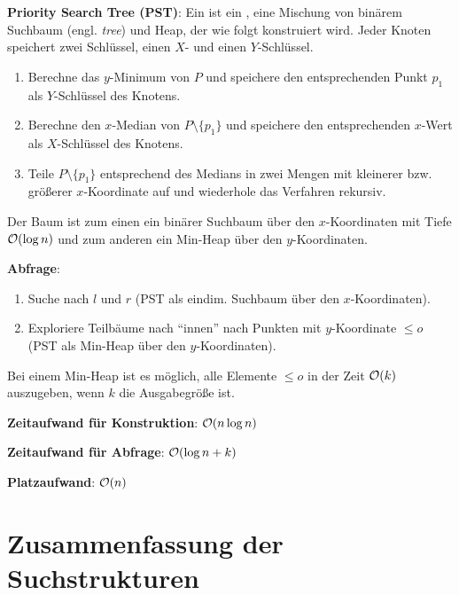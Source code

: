 \textbf{Priority Search Tree (PST)}:
Ein  ist ein , eine Mischung von
binärem Suchbaum (engl. \emph{tree}) und Heap, der wie folgt konstruiert wird.
Jeder Knoten speichert zwei Schlüssel, einen $X$- und einen $Y$-Schlüssel.
\begin{enumerate}
    \item
    Berechne das $y$-Minimum von $P$ und
    speichere den entsprechenden Punkt $p_1$ als $Y$-Schlüssel des Knotens.

    \item
    Berechne den $x$-Median von $P \setminus \{p_1\}$ und
    speichere den entsprechenden $x$-Wert als $X$-Schlüssel des Knotens.

    \item
    Teile $P \setminus \{p_1\}$ entsprechend des Medians in zwei Mengen mit kleinerer bzw.
    größerer $x$-Koordinate auf und wiederhole das Verfahren rekursiv.
\end{enumerate}

Der Baum ist zum einen ein binärer Suchbaum über den $x$-Koordinaten mit Tiefe $\mathcal{O}(\log n)$
und zum anderen ein Min-Heap über den $y$-Koordinaten.

\linie

\textbf{Abfrage}:
\begin{enumerate}
    \item
    Suche nach $l$ und $r$ (PST als eindim. Suchbaum über den $x$-Koordinaten).

    \item
    Exploriere Teilbäume nach "`innen"' nach Punkten mit $y$-Koordinate $\le o$\\
    (PST als Min-Heap über den $y$-Koordinaten).
\end{enumerate}

Bei einem Min-Heap ist es möglich, alle Elemente $\le o$ in der Zeit $\mathcal{O}(k)$ auszugeben,
wenn $k$ die Ausgabegröße ist.

\linie

\textbf{Zeitaufwand für Konstruktion}:
$\mathcal{O}(n \log n)$

\textbf{Zeitaufwand für Abfrage}:
$\mathcal{O}(\log n + k)$

\textbf{Platzaufwand}:
$\mathcal{O}(n)$

\section{%
    Zusammenfassung der Suchstrukturen%
}

